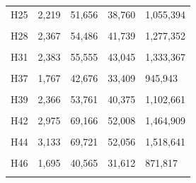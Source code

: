 \documentclass[
  a4paper,
  titlepage]{article}
\begin{document}
\begin{longtable}[t]{lllll}
H25 & 2,219 & 51,656 & 38,760 & 1,055,394\\
 
\cellcolor{gray!6}{H26} & \cellcolor{gray!6}{2,186} & \cellcolor{gray!6}{51,896} & \cellcolor{gray!6}{40,123} & \cellcolor{gray!6}{1,174,972}\\
 
H28 & 2,367 & 54,486 & 41,739 & 1,277,352\\
 
\cellcolor{gray!6}{H30} & \cellcolor{gray!6}{2,680} & \cellcolor{gray!6}{62,536} & \cellcolor{gray!6}{46,858} & \cellcolor{gray!6}{1,384,937}\\
 
H31 & 2,383 & 55,555 & 43,045 & 1,333,367\\
 
\cellcolor{gray!6}{H36} & \cellcolor{gray!6}{2,866} & \cellcolor{gray!6}{65,771} & \cellcolor{gray!6}{50,253} & \cellcolor{gray!6}{1,378,099}\\
 
H37 & 1,767 & 42,676 & 33,409 & 945,943\\
 
\cellcolor{gray!6}{H38} & \cellcolor{gray!6}{2,556} & \cellcolor{gray!6}{58,874} & \cellcolor{gray!6}{45,432} & \cellcolor{gray!6}{1,412,043}\\
 
H39 & 2,366 & 53,761 & 40,375 & 1,102,661\\
 
\cellcolor{gray!6}{H41} & \cellcolor{gray!6}{2,855} & \cellcolor{gray!6}{64,750} & \cellcolor{gray!6}{49,611} & \cellcolor{gray!6}{1,510,217}\\
 
H42 & 2,975 & 69,166 & 52,008 & 1,464,909\\
 
\cellcolor{gray!6}{H43} & \cellcolor{gray!6}{2,555} & \cellcolor{gray!6}{58,169} & \cellcolor{gray!6}{44,153} & \cellcolor{gray!6}{1,134,453}\\
 
H44 & 3,133 & 69,721 & 52,056 & 1,518,641\\
 
\cellcolor{gray!6}{H45} & \cellcolor{gray!6}{2,699} & \cellcolor{gray!6}{61,671} & \cellcolor{gray!6}{46,452} & \cellcolor{gray!6}{1,316,154}\\
 
H46 & 1,695 & 40,565 & 31,612 & 871,817\\
 
\cellcolor{gray!6}{H47} & \cellcolor{gray!6}{2,358} & \cellcolor{gray!6}{56,064} & \cellcolor{gray!6}{42,591} & \cellcolor{gray!6}{1,118,584}\\
 

\end{longtable}
\end{document}
